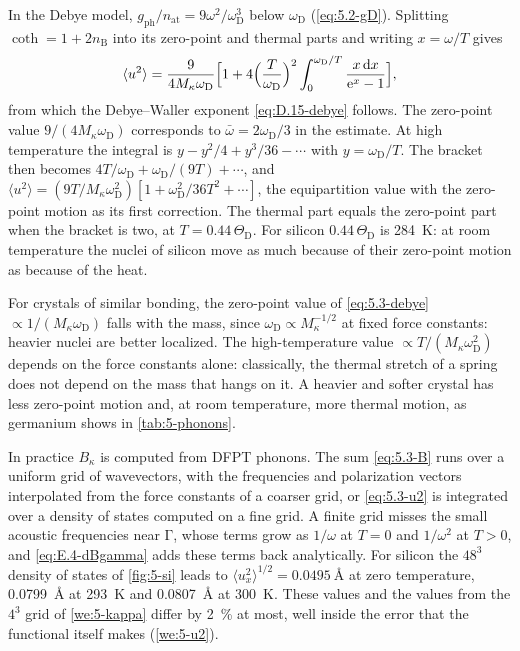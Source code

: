 In the Debye model, $g_{\mathrm{ph}}/n_{\mathrm{at}} = 9\omega^2/\omega_{\mathrm{D}}^3$ below $\omega_{\mathrm{D}}$ (\cref{eq:5.2-gD}). Splitting $\coth = 1 + 2n_{\mathrm{B}}$ into its zero-point and thermal parts and writing $x = \omega/T$ gives
\begin{equation}
  \langle u^2\rangle = \frac{9}{4M_\kappa\omega_{\mathrm{D}}}\Bigl[1 + 4\Bigl(\frac{T}{\omega_{\mathrm{D}}}\Bigr)^2\int_0^{\omega_{\mathrm{D}}/T}\frac{x\,\mathrm{d} x}{\mathrm{e}^x - 1}\Bigr] ,
  \label{eq:5.3-debye}
\end{equation}
from which the Debye--Waller exponent \cref{eq:D.15-debye} follows. The zero-point value $9/(4M_\kappa\omega_{\mathrm{D}})$ corresponds to $\bar\omega = 2\omega_{\mathrm{D}}/3$ in the estimate. At high temperature the integral is $y - y^2/4 + y^3/36 - \cdots$ with $y = \omega_{\mathrm{D}}/T$. The bracket then becomes $4T/\omega_{\mathrm{D}} + \omega_{\mathrm{D}}/(9T) + \cdots$, and $\langle u^2\rangle = (9T/M_\kappa\omega_{\mathrm{D}}^2)[1 + \omega_{\mathrm{D}}^2/36T^2 + \cdots]$, the equipartition value with the zero-point motion as its first correction. The thermal part equals the zero-point part when the bracket is two, at $T = 0.44\,\Theta_{\mathrm{D}}$. For silicon $0.44\,\Theta_{\mathrm{D}}$ is \SI{284}{K}: at room temperature the nuclei of silicon move as much because of their zero-point motion as because of the heat.

For crystals of similar bonding, the zero-point value of \cref{eq:5.3-debye} $\propto 1/(M_\kappa\omega_{\mathrm{D}})$ falls with the mass, since $\omega_{\mathrm{D}} \propto M_\kappa^{-1/2}$ at fixed force constants: heavier nuclei are better localized. The high-temperature value $\propto T/(M_\kappa\omega_{\mathrm{D}}^2)$ depends on the force constants alone: classically, the thermal stretch of a spring does not depend on the mass that hangs on it. A heavier and softer crystal has less zero-point motion and, at room temperature, more thermal motion, as germanium shows in \cref{tab:5-phonons}.

In practice $B_\kappa$ is computed from DFPT phonons. The sum \cref{eq:5.3-B} runs over a uniform grid of wavevectors, with the frequencies and polarization vectors interpolated from the force constants of a coarser grid, or \cref{eq:5.3-u2} is integrated over a density of states computed on a fine grid. A finite grid misses the small acoustic frequencies near $\mathrm{\Gamma}$, whose terms grow as $1/\omega$ at $T = 0$ and $1/\omega^2$ at $T > 0$, and \cref{eq:E.4-dBgamma} adds these terms back analytically. For silicon the $48^3$ density of states of \cref{fig:5-si} leads to $\langle u_x^2\rangle^{1/2} = \SI{0.0495}{\angstrom}$ at zero temperature, \SI{0.0799}{\angstrom} at \SI{293}{K} and \SI{0.0807}{\angstrom} at \SI{300}{K}. These values and the values from the $4^3$ grid of \cref{we:5-kappa} differ by \SI{2}{\percent} at most, well inside the error that the functional itself makes (\cref{we:5-u2}).

